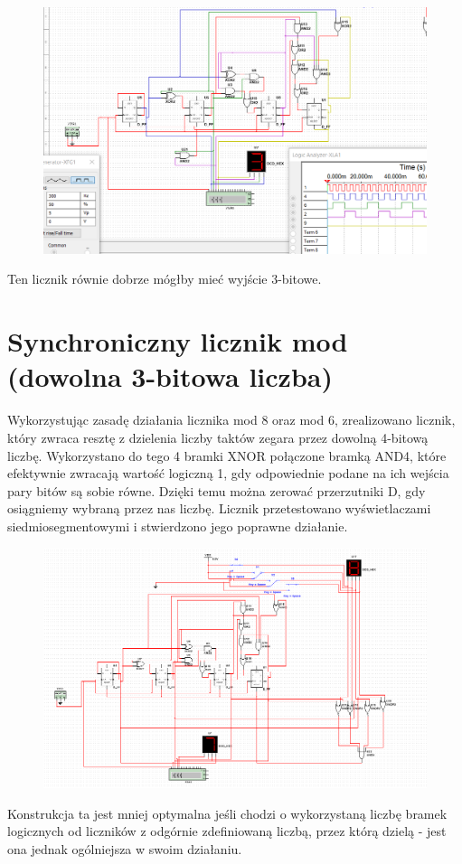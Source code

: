 \documentclass[12pt,a4paper]{article}
\begin{document}
\begin{figure}[H]
\centering
\includegraphics[width=\textwidth]{img/4d_4bit_mod6}
\end{figure}

Ten licznik równie dobrze mógłby mieć wyjście 3-bitowe.

\section{Synchroniczny licznik mod (dowolna 3-bitowa liczba)}

Wykorzystując zasadę działania licznika mod 8 oraz mod 6, zrealizowano licznik, który zwraca resztę z dzielenia liczby taktów zegara przez dowolną 4-bitową liczbę. Wykorzystano do tego 4 bramki XNOR połączone bramką AND4, które efektywnie zwracają wartość logiczną 1, gdy odpowiednie podane na ich wejścia pary bitów są sobie równe. Dzięki temu można zerować przerzutniki D, gdy osiągniemy wybraną przez nas liczbę. Licznik przetestowano wyświetlaczami siedmiosegmentowymi i stwierdzono jego poprawne działanie. 

\begin{figure}[H]
\centering
\includegraphics[width=\textwidth]{img/4extra_4bit}
\end{figure}

Konstrukcja ta jest mniej optymalna jeśli chodzi o wykorzystaną liczbę bramek logicznych od liczników z odgórnie zdefiniowaną liczbą, przez którą dzielą - jest ona jednak ogólniejsza w swoim działaniu.
\end{document}
